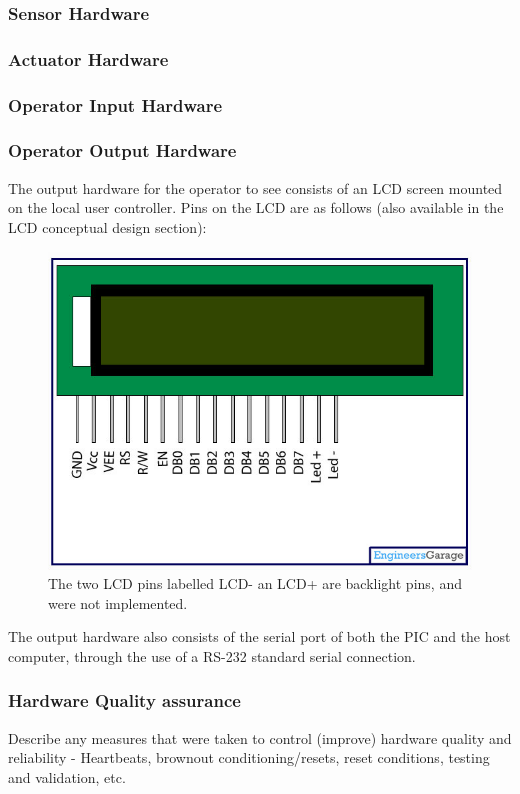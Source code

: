 \documentclass[]{report}
\begin{document}
\subsubsection{Sensor Hardware}

\subsubsection{Actuator Hardware}

\subsubsection{Operator Input Hardware}

\subsubsection{Operator Output Hardware}
The output hardware for the operator to see consists of an LCD screen mounted on the local user controller. Pins on the LCD are as follows (also available in the LCD conceptual design section):

\begin{figure}
\centering
\includegraphics[width=0.7\linewidth]{"../Diagrams/LcdPins"}
\caption[LCDPinDiagram]{The two LCD pins labelled LCD- an LCD+ are backlight pins, and were not implemented.}
\label{fig:LCDPinDiagram}
\end{figure}

The output hardware also consists of the serial port of both the PIC and the host computer, through the use of a RS-232 standard serial connection.


\subsubsection{Hardware Quality assurance}
Describe any measures that were taken to control (improve) hardware quality and reliability - Heartbeats, brownout conditioning/resets, reset conditions, testing and validation, etc.
\end{document}

